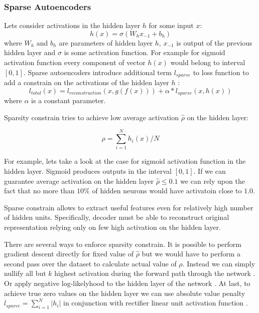 \subsubsection{Sparse Autoencoders}\label{ch:vae}

Lets consider activations in the hidden layer $h$ for some input $x$:
\begin{equation}
  h(x) = \sigma(W_{h}x_{-1} + b_{h})
\end{equation}
where $W_h$ and $b_h$ are parameters of hidden layer $h$, $x_{-1}$ is output of the previous hidden layer and $\sigma$ is some activation function.
For example for sigmoid activation function every component of vector $h(x)$ would belong to interval $[0, 1]$.
Sparse autoencoders introduce additional term $l_{sparse}$ to loss function to add a constrain on the activations of the hidden layer $h$ \cite{Ng2011}:
\begin{equation}
  l_{total}(x) = l_{reconstruction}(x, g(f(x))) + \alpha*l_{sparse}(x, h(x))
\end{equation}
where $\alpha$ is a constant parameter.

Sparsity constrain tries to achieve low average activation $\hat{\rho}$ on the hidden layer:

\begin{equation}\label{eq:avgh}
  \rho = \sum_{i=1}^N h_i(x)/N
\end{equation}

For example, lets take a look at the case for sigmoid activation function in the hidden layer.
Sigmoid produces outputs in the interval $[0, 1]$. If we can guarantee average activation on the hidden layer $\hat{\rho} \leq 0.1$ we can rely upon the fact that no more than $10\%$ of hidden neurons would have activatoin close to $1.0$.

Sparse constrain allows to extract useful features even for relatively high number of hidden units. Specifically, decoder must be able to reconstruct original representation relying only on few high activation on the hidden layer.

There are several ways to enforce sparsity constrain.
It is possible to perform gradient descent directly for fixed value of $\hat{\rho}$ but we would have to perform a second pass over the dataset to calculate actual value of $\rho$. Instead we can simply nullify all but $k$ highest activation during the forward path through the network \cite{Kulkarni2015}.
Or apply negative log-likelyhood to the hidden layer of the network \cite{Zhao2015}.
At last, to achieve true zero values on the hidden layer we can use absolute value penalty $l_{sparce}=\sum_{i=1}^N |h_i|$ in conjunction with rectifier linear unit activation function \cite{Glorot2011}.

